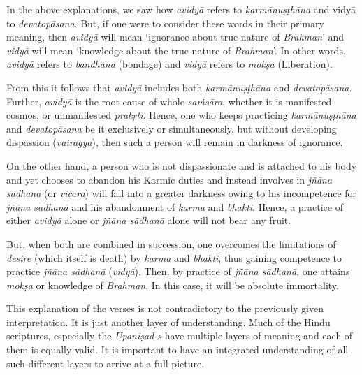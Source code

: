 In the above explanations, we saw how \emph{avidyā} refers to \emph{karmānuṣṭhāna} and vidyā to \emph{devatopāsana}. But, if one were to consider these words in their primary meaning, then \emph{avidyā} will mean `ignorance about true nature of \emph{Brahman}' and \emph{vidyā} will mean `knowledge about the true nature of \emph{Brahman}'. In other words, \emph{avidyā} refers to \emph{bandhana} (bondage) and \emph{vidyā} refers to \emph{mokṣa} (Liberation).

From this it follows that \emph{avidyā} includes both \emph{karmānuṣṭhāna} and \emph{devatopāsana}. Further, \emph{avidyā} is the root-cause of whole \emph{saṁsāra}, whether it is manifested cosmos, or unmanifested \emph{prakṛti}. Hence, one who keeps practicing \emph{karmānuṣṭhāna} and \emph{devatopāsana} be it exclusively or simultaneously, but without developing dispassion (\emph{vairāgya}), then such a person will remain in darkness of ignorance.

On the other hand, a person who is not dispassionate and is attached to his body and yet chooses to abandon his Karmic duties and instead involves in \emph{jñāna sādhanā} (or \emph{vicāra}) will fall into a greater darkness owing to his incompetence for \emph{jñāna sādhanā} and his abandonment of \emph{karma} and \emph{bhakti}. Hence, a practice of either \emph{avidyā} alone or \emph{jñāna sādhanā} alone will not bear any fruit.

But, when both are combined in succession, one overcomes the limitations of \emph{desire} (which itself is death) by \emph{karma} and \emph{bhakti}, thus gaining competence to practice \emph{jñāna sādhanā} (\emph{vidyā}). Then, by practice of \emph{jñāna sādhanā}, one attains \emph{mokṣa} or knowledge of \emph{Brahman}. In this case, it will be absolute immortality.

This explanation of the verses is not contradictory to the previously given interpretation. It is just another layer of understanding. Much of the Hindu scriptures, especially the \emph{Upaniṣad-s} have multiple layers of meaning and each of them is equally valid. It is important to have an integrated understanding of all such different layers to arrive at a full picture.


